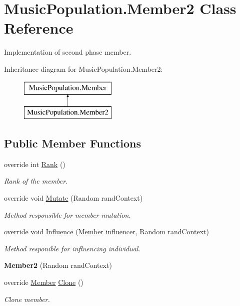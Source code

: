 \hypertarget{class_music_population_1_1_member2}{\section{Music\+Population.\+Member2 Class Reference}
\label{class_music_population_1_1_member2}
}


Implementation of second phase member.  


Inheritance diagram for Music\+Population.\+Member2\+:\begin{figure}[H]
\begin{center}
\leavevmode
\includegraphics[height=2.000000cm]{class_music_population_1_1_member2}
\end{center}
\end{figure}
\subsection*{Public Member Functions}
\begin{DoxyCompactItemize}
\item 
override int \hyperlink{class_music_population_1_1_member2_a1978ab05a86b98491d5ce7d201cfd4f0}{Rank} ()
\begin{DoxyCompactList}\small\item\em Rank of the member. \end{DoxyCompactList}\item 
override void \hyperlink{class_music_population_1_1_member2_a30e51d2e61399a954b006cdbd6a37952}{Mutate} (Random rand\+Context)
\begin{DoxyCompactList}\small\item\em Method responsible for member mutation. \end{DoxyCompactList}\item 
override void \hyperlink{class_music_population_1_1_member2_af413c7ad74a1979698f87fece3d02f3e}{Influence} (\hyperlink{class_music_population_1_1_member}{Member} influencer, Random rand\+Context)
\begin{DoxyCompactList}\small\item\em Method responible for influencing individual. \end{DoxyCompactList}\item 
\hypertarget{class_music_population_1_1_member2_a77c259e324f669d446ba8c3a4a8e959f}{{\bfseries Member2} (Random rand\+Context)}\label{class_music_population_1_1_member2_a77c259e324f669d446ba8c3a4a8e959f}

\item 
override \hyperlink{class_music_population_1_1_member}{Member} \hyperlink{class_music_population_1_1_member2_a6e676c34e7af1ef9ffbbe68cfa38424f}{Clone} ()
\begin{DoxyCompactList}\small\item\em Clone member. \end{DoxyCompactList}\end{DoxyCompactItemize}
